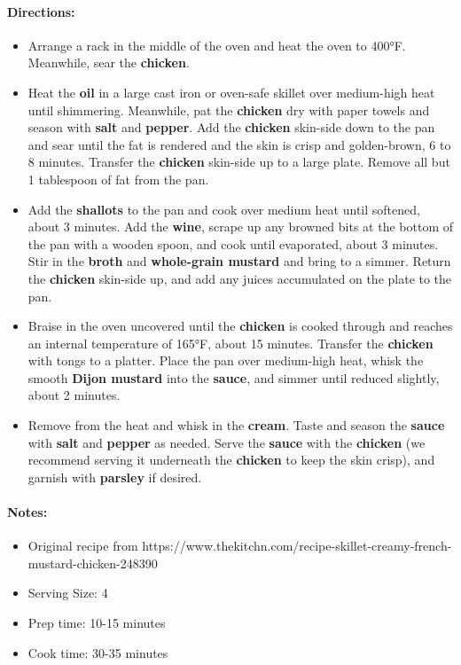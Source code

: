 \documentclass{article}
\begin{document}
\paragraph{Directions:}
\begin{itemize}
    \item Arrange a rack in the middle of the oven and heat the oven to 400°F. Meanwhile, sear the \textbf{chicken}.
    \item Heat the \textbf{oil} in a large cast iron or oven-safe skillet over medium-high heat until shimmering. Meanwhile, pat the \textbf{chicken} dry with paper towels and season with \textbf{salt} and \textbf{pepper}. Add the \textbf{chicken} skin-side down to the pan and sear until the fat is rendered and the skin is crisp and golden-brown, 6 to 8 minutes. Transfer the \textbf{chicken} skin-side up to a large plate. Remove all but 1 tablespoon of fat from the pan.
    \item Add the \textbf{shallots} to the pan and cook over medium heat until softened, about 3 minutes. Add the \textbf{wine}, scrape up any browned bits at the bottom of the pan with a wooden spoon, and cook until evaporated, about 3 minutes. Stir in the \textbf{broth} and \textbf{whole-grain mustard} and bring to a simmer. Return the \textbf{chicken} skin-side up, and add any juices accumulated on the plate to the pan.
    \item Braise in the oven uncovered until the \textbf{chicken} is cooked through and reaches an internal temperature of 165°F, about 15 minutes. Transfer the \textbf{chicken} with tongs to a platter. Place the pan over medium-high heat, whisk the smooth \textbf{Dijon mustard} into the \textbf{sauce}, and simmer until reduced slightly, about 2 minutes.
    \item Remove from the heat and whisk in the \textbf{cream}. Taste and season the \textbf{sauce} with \textbf{salt} and \textbf{pepper} as needed. Serve the \textbf{sauce} with the \textbf{chicken} (we recommend serving it underneath the \textbf{chicken} to keep the skin crisp), and garnish with \textbf{parsley} if desired.
\end{itemize}

\paragraph{Notes:}
\begin{itemize}
    \item Original recipe from https://www.thekitchn.com/recipe-skillet-creamy-french-mustard-chicken-248390
    \item Serving Size: 4
    \item Prep time: 10-15 minutes
    \item Cook time: 30-35 minutes
\end{itemize}
\end{document}
